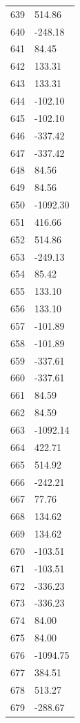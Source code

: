 \documentclass[a4paper,11pt]{article}
\begin{document}
\begin{center}
\begin{longtable}{|R{1.5cm}|R{2.5cm}|}
  639 &       514.86 \\
  640 &      -248.18 \\
  641 &        84.45 \\
  642 &       133.31 \\
  643 &       133.31 \\
  644 &      -102.10 \\
  645 &      -102.10 \\
  646 &      -337.42 \\
  647 &      -337.42 \\
  648 &        84.56 \\
  649 &        84.56 \\
  650 &     -1092.30 \\
  651 &       416.66 \\
  652 &       514.86 \\
  653 &      -249.13 \\
  654 &        85.42 \\
  655 &       133.10 \\
  656 &       133.10 \\
  657 &      -101.89 \\
  658 &      -101.89 \\
  659 &      -337.61 \\
  660 &      -337.61 \\
  661 &        84.59 \\
  662 &        84.59 \\
  663 &     -1092.14 \\
  664 &       422.71 \\
  665 &       514.92 \\
  666 &      -242.21 \\
  667 &        77.76 \\
  668 &       134.62 \\
  669 &       134.62 \\
  670 &      -103.51 \\
  671 &      -103.51 \\
  672 &      -336.23 \\
  673 &      -336.23 \\
  674 &        84.00 \\
  675 &        84.00 \\
  676 &     -1094.75 \\
  677 &       384.51 \\
  678 &       513.27 \\
  679 &      -288.67 \\

\end{longtable}
\end{center}
\end{document}
